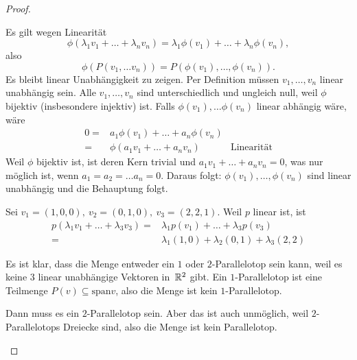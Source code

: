 \begin{proof}
\begin{parts}
\begin{center}
\end{center}
	\item Es gilt wegen Linearität
		\[
			\phi(\lambda_1v_1+\dots+\lambda_n v_n)=\lambda_1\phi(v_1)+\dots+\lambda_n\phi(v_n)
		,\]
		also
		\[
		\phi(P(v_1,\dots v_n))=P(\phi(v_1),\dots, \phi(v_n))
		.\] 
	Es bleibt linear Unabhängigkeit zu zeigen. Per Definition müssen $v_1,\dots, v_n$ linear unabhängig sein. Alle $v_1,\dots, v_n$ sind unterschiedlich und ungleich null, weil $\phi$ bijektiv (insbesondere injektiv) ist. Falls $\phi(v_1),\dots \phi(v_n)$ linear abhängig wäre, wäre
	\begin{align*}
		0=&a_1\phi(v_1)+\dots+a_n\phi(v_n)\\
		=&\phi(a_1v_1+\dots+a_nv_n) & \text{Linearität}
	\end{align*}
	Weil $\phi$ bijektiv ist, ist deren Kern trivial und $a_1v_1+\dots+a_n v_n=0$, was nur möglich ist, wenn $a_1=a_2=\dots a_n=0$. Daraus folgt: $\phi(v_1),\dots, \phi(v_n)$ sind linear unabhängig und die Behauptung folgt.
\item Sei $v_1=(1,0,0),~v_2=(0,1,0),~v_3=(2,2,1)$. Weil $p$ linear ist, ist
	\begin{align*}
		p(\lambda_1v_1+\dots+\lambda_3v_3)=&\lambda_1p(v_1)+\dots+\lambda_3p(v_3)\\
		=&\lambda_1(1,0)+\lambda_2(0,1)+\lambda_3(2,2)
	\end{align*}
	\begin{center}
	\end{center}
	Es ist klar, dass die Menge entweder ein $1$ oder $2$-Parallelotop sein kann, weil es keine $3$ linear unabhängige Vektoren in $\mathbb{R}^2$ gibt. Ein $1$-Parallelotop ist eine Teilmenge $P(v)\subseteq \text{span}v$, also die Menge ist kein $1$-Parallelotop.

	Dann muss es ein $2$-Parallelotop sein. Aber das ist auch unmöglich, weil $2$-Parallelotops Dreiecke sind, also die Menge ist kein Parallelotop. \qedhere
	\end{parts}
\end{proof}
